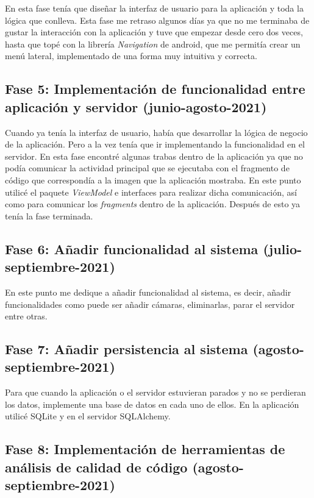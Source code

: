 En esta fase tenía que diseñar la interfaz de usuario para la aplicación y toda la lógica que conlleva. 
Esta fase me retraso algunos días ya que no me terminaba de gustar la interacción con la aplicación y tuve que empezar desde cero dos veces, hasta que topé con la librería \textit{Navigation} de android, que me permitía crear un menú lateral, implementado de una forma muy intuitiva y correcta.

\subsection{Fase 5: Implementación de funcionalidad entre aplicación y servidor (junio-agosto-2021)}

Cuando ya tenía la interfaz de usuario, había que desarrollar la lógica de negocio de la aplicación. 
Pero a la vez tenía que ir implementando la funcionalidad en el servidor.
En esta fase encontré algunas trabas dentro de la aplicación ya que no podía comunicar la actividad principal que se ejecutaba con el fragmento de código que correspondía a la imagen que la aplicación mostraba.
En este punto utilicé el paquete \textit{ViewModel} e interfaces para realizar dicha comunicación, así como para comunicar los \textit{fragments} dentro de la aplicación.
Después de esto ya tenía la fase terminada.

\subsection{Fase 6: Añadir funcionalidad al sistema (julio-septiembre-2021)}

En este punto me dedique a añadir funcionalidad al sistema, es decir, añadir funcionalidades como puede ser añadir cámaras, eliminarlas, parar el servidor entre otras.

\subsection{Fase 7: Añadir persistencia al sistema (agosto-septiembre-2021)}

Para que cuando la aplicación o el servidor estuvieran parados y no se perdieran los datos, implemente una base de datos en cada uno de ellos. 
En la aplicación utilicé SQLite y en el servidor SQLAlchemy.

\subsection{Fase 8: Implementación de herramientas de análisis de calidad de código (agosto-septiembre-2021)} \label{fase8}

